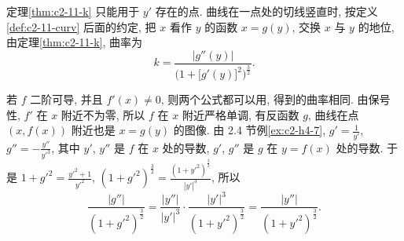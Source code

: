 \documentclass[UTF8,openany]{ctexbook}
\theoremstyle{chinesetextbook}
\begin{document}
定理\ref{thm:c2-11-k} 只能用于 $y'$ 存在的点. 曲线在一点处的切线竖直时, 按定义\ref{def:c2-11-curv} 后面的约定, 把 $x$ 看作 $y$ 的函数 $x=g(y)$, 交换 $x$ 与 $y$ 的地位, 由定理\ref{thm:c2-11-k}, 曲率为
\[
k=\frac{|g''(y)|}{\bigl(1+\bigl[g'(y)\bigr]^2\bigr)^{\frac32}}.
\]

若 $f$ 二阶可导, 并且 $f'(x)\ne0$, 则两个公式都可以用, 得到的曲率相同. 由保号性, $f'$ 在 $x$ 附近不为零, 所以 $f$ 在 $x$ 附近严格单调, 有反函数 $g$, 曲线在点 $(x,f(x))$ 附近也是 $x=g(y)$ 的图像. 由 2.4 节例\ref{ex:c2-h4-7}, $\displaystyle g'=\frac1{y'}$, $\displaystyle g''=-\frac{y''}{y'^3}$, 其中 $y'$, $y''$ 是 $f$ 在 $x$ 处的导数, $g'$, $g''$ 是 $g$ 在 $y=f(x)$ 处的导数. 于是 $\displaystyle1+g'^2=\frac{y'^2+1}{y'^2}$, $\displaystyle(1+g'^2)^{\frac32}=\frac{(1+y'^2)^{\frac32}}{|y'|^3}$, 所以
\[
\frac{|g''|}{(1+g'^2)^{\frac32}}=\frac{|y''|}{|y'|^3}\cdot\frac{|y'|^3}{(1+y'^2)^{\frac32}}=\frac{|y''|}{(1+y'^2)^{\frac32}}.
\]
\end{document}
